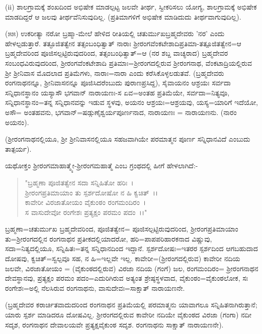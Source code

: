 (ii) ಶಾಲಗ್ರಾಮಕ್ಕೆ ಶಂಖದಿಂದ ಅಭಿಷೇಕ ಮಾಡಲ್ಪಟ್ಟ ಜಲವೇ ತೀರ್ಥ, ಸ್ವೀಕರಿಸಲು ಯೋಗ್ಯ, ಶಾಲಗ್ರಾಮಕ್ಕೆ ಅಭಿಷೇಕ ಮಾಡದಿದ್ದರೆ ಆ ಜಲವು ತೀರ್ಥವೆನಿಸುವುದಿಲ್ಲ. (ಪ್ರತಿಮಾಗಳಿಗೆ ಅಭಿಷೇಕ ಮಾಡಿದುದು ತೀರ್ಥವಾಗುವುದಿಲ್ಲ).

(೫೫) ಉಕರೀತ್ಯಾ ನರೋ ಬ್ರಹ್ಮಾ-ಮೇಲೆ ಹೇಳಿದ ರೀತಿಯಲ್ಲಿ ಚತುರ್ಮುಖಬ್ರಹ್ಮದೇವರು 'ನರ' ಎಂದು ಹೇಳಲ್ಪಡುತ್ತಾರೆ. ತತ್ಫೂಜಿತತ್ವೇನ ತತ್ಸಂಬಂಧಿತ್ವಾತ್ ನಾರಾಃ ಶ‍್ರೀರಂಗವೆಂಕಟೇಶಾದಿಪ್ರತಿಮಾ-ತತ್ಪೂಜಿತತ್ವೇನ=ಆ ಬ್ರಹ್ಮದೇವರಿಂದ ಪೂಜಿಸಲ್ಪಟ್ಟಿರುವುದರಿಂದ, ತತ್ಸಂಬಂಧಿತ್ವಾತ್=ಆ (ನರ ಶಬ್ದ ವಾಚ್ಯರಾದ) ಬ್ರಹ್ಮದೇವರ ಸಂಬಂಧವಿರುವುದರಿಂದ, ಶ‍್ರೀರಂಗವೆಂಕಟೇಶಾದಿ ಪ್ರತಿಮಾಃ=ಶ‍್ರೀರಂಗದಲ್ಲಿರುವ ಶ‍್ರೀರಂಗನಾಥ, ವೆಂಕಟಾದ್ರಿಯಲ್ಲಿರುವ ಶ‍್ರೀ ಶ‍್ರೀನಿವಾಸ ಮೊದಲಾದ ಪ್ರತಿಮೆಗಳು, ನಾರಾಃ=ನಾರಾ ಎಂದು ಕರೆಸಿಕೊಳ್ಳಲಡುತವೆ. (ಬ್ರಹ್ಮದೇವರು ರಂಗನಾಥನನ್ನೂ, ಶ‍್ರೀನಿವಾಸನನ್ನೂ ಪೂಜಿಸಿದರೆಂಬುದು ಪುರಾಣಪ್ರಸಿದ್ದ), ಸೈವಾಯನಂ ಆಶ್ರಯಃ ಸರ್ವದಾ ಸನ್ನಿಧಾನಸ್ಥಾನಂ ಯಸ್ಯಾಸೌ ಭಗವಾನ್ ನಾರಾಯಣಃ-ಸ ಏವ=ಅಂತಹ ಪ್ರತಿಮೆಯೇ, ಸರ್ವದಾ=ನಿತ್ಯವೂ, ಸನ್ನಿಧಾನಸ್ಥಾನಂ=ತನ್ನ ಸನ್ನಿಧಾನವನ್ನು ಇಡುವ ಸ್ಥಳವು, ಅಯನಂ ಆಶ್ರಯಃ=ಆಶ್ರಯವು, ಯಸ್ಯ=ಯಾರಿಗೆ ಇದೆಯೋ, ಅಸೌ= ಅಂತಹವನು, ಭಗವಾನ್=ಷಡ್ಗುಣೈಶ್ವರ್ಯಪೂರ್ಣನಾದ, ನಾರಾಯಣಃ = ನಾರಾಯಣನು. (ನಾರಂ ಅಯನಂ).

(ಶ‍್ರೀರಂಗನಾಥನಲ್ಲಿಯೂ, ಶ‍್ರೀ ಶ‍್ರೀನಿವಾಸನಲ್ಲಿಯೂ ಸಹಜವಾಗಿಯೇ ಪರಮಾತ್ಮನ ಪೂರ್ಣ ಸನ್ನಿಧಾನವಿದೆ ಎಂಬುದು ತಾತ್ಪರ್ಯ).

ಯಥೋಕ್ತಂ ಶ‍್ರೀರಂಗಮಾಹಾತ್ಮ್ಯೇ-ಶ‍್ರೀರಂಗಮಹಾತ್ಮೆ ಎಂಬ ಗ್ರಂಥದಲ್ಲಿ ಹೀಗೆ ಹೇಳಲಾಗಿದೆ:-

\begin{verse}
"ಬ್ರಹ್ಮಣಾ ಪೂಜಿತತ್ವೇನ ಸದಾ ಸನ್ನಿಹಿತೋ ಹರಿಃ~।\\ ಶ‍್ರೀರಂಗಪ್ರತಿಮಾಯಾಂ ತು ಸ್ಪರ್ಶದೋಷೋ ನ ಹಿ ಕ್ವಚಿತ್~।।\\ ಕಾವೇರೀ ವಿರಜಾತೋಯಂ ವೈಕುಂಠಂ ರಂಗಮಂದಿರಂ~।\\ ಸ ವಾಸುದೇವೋ ರಂಗೇಶಃ ಪ್ರತ್ಯಕ್ಷಂ ಪರಮಂ ಪದಂ~।।"
\end{verse}


ಬ್ರಹ್ಮಣಾ=ಚತುರ್ಮುಖ ಬ್ರಹ್ಮದೇವರಿಂದ, ಪೂಜಿತತ್ವೇನ= ಪೂಜಿಸಲ್ಪಟ್ಟಿರುವುದರಿಂದ, ಶ‍್ರೀರಂಗಪ್ರತಿಮಾಯಾಂ ತು=ಶ‍್ರೀರಂಗದಲ್ಲಿನ ರಂಗನಾಥನ ಪ್ರತೀಕದಲ್ಲಿಯಾದರೋ, ಹರಿ=ಪಾಪಪರಿಹಾರಕನಾದ ವಿಷ್ಣುವು, ಸದಾ=ನಿತ್ಯದಲ್ಲಿಯೂ, ಸನ್ನಿಹಿತಃ=ತನ್ನ ಸನ್ನಿಧಾನದಿಂದ ಇದ್ದಾನೆ. ಸ್ಪರ್ಶದೋಷಃ=ಇತರರ ಸ್ಪರ್ಶದಿಂದ ಆಗಬಹುದಾದ ದೋಷವು, ಕ್ವಚಿತ್=ಸ್ವಲ್ಪವೂ ಸಹ, ನ ಹಿ=ಇಲ್ಲವೇ ಇಲ್ಲ. ಕಾವೇರೀ=(ಶ‍್ರೀರಂಗದಲ್ಲಿರುವ) ಕಾವೇರೀ ನದಿಯ ಜಲವೇ, ವಿರಜಾತೋಯಂ = (ವೈಕುಂಠದಲ್ಲಿರುವ) ವಿರಜಾ ನದಿಯ (ಗಂಗೆ) ಜಲ, ರಂಗಮಂದಿರಂ= ಶ‍್ರೀರಂಗನಾಥನ ದೇವಸ್ಥಾನವು, ಪ್ರತ್ಯಕ್ಷಂ ಪರಮಂ ಪದಂ=ಎದುರಿಗಿರುವ ಅತ್ಯಂತ ಶ್ರೇಷ್ಠಸ್ಥಳವಾದ, ವೈಕುಂಠಂ=ವೈಕುಂಠಲೋಕ, ಸಃ ರಂಗೇಶಃ=ಅಲ್ಲಿ ನೆಲಸಿರುವ ರಂಗನಾಥನು, ವಾಸುದೇವಃ=ಸಾಕ್ಷಾತ್ ನಾರಾಯಣನೇ.

(ಬ್ರಹ್ಮದೇವರ ಕರಾರ್ಚಿತವಾದುದರಿಂದ ರಂಗನಾಥನ ಪ್ರತಿಮೆಯಲ್ಲಿ ಪರಮಾತ್ಮನು ಯಾವಾಗಲೂ ಸನ್ನಿಹಿತನಾಗಿರುತ್ತಾನೆ; ಯಾರು ಸ್ಪರ್ಶ ಮಾಡಿದರೂ ದೋಷವಿಲ್ಲ. ಶ‍್ರೀರಂಗದಲ್ಲಿರುವ ಕಾವೇರೀ ನದಿಯೇ ವೈಕುಂಠದ ವಿರಜಾ (ಗಂಗಾ) ನದೀ ಸದೃಶ, ರಂಗನಾಥನ ದೇವಾಲಯವೇ ಪ್ರತ್ಯಕ್ಷವೈಕುಂಠ ಸದೃಶ. ರಂಗನಾಥನು ಸಾಕ್ಷಾತ್ ನಾರಾಯಣನೇ).

